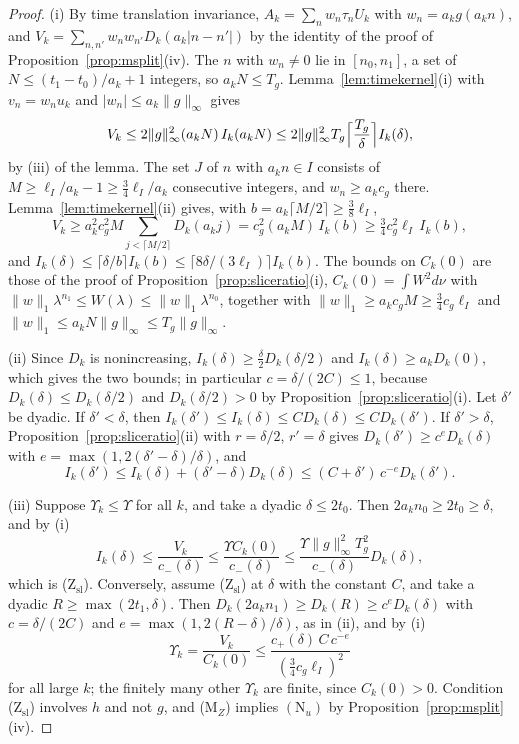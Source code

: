 \documentclass[aps,prd,twocolumn,superscriptaddress,nofootinbib,longbibliography,floatfix,amsmath,amssymb,10pt]{revtex4-2}
\theoremstyle{definition}
\theoremstyle{remark}
\begin{document}
\begin{proof}
(i) By time translation invariance, $A_k=\sum_nw_n\tau_nU_k$ with
$w_n=a_kg(a_kn)$, and $V_k=\sum_{n,n'}w_nw_{n'}D_k(a_k|n-n'|)$ by the
identity of the proof of Proposition~\ref{prop:msplit}(iv). The $n$ with
$w_n\ne0$ lie in $[n_0,n_1]$, a set of $N\le(t_1-t_0)/a_k+1$ integers, so
$a_kN\le T_g$. Lemma~\ref{lem:timekernel}(i) with $v_n=w_nu_k$ and
$|w_n|\le a_k\|g\|_\infty$ gives
\[
V_k\le2\|g\|_\infty^2(a_kN)\,I_k(a_kN)\le2\|g\|_\infty^2T_g\Bigl\lceil
\frac{T_g}\delta\Bigr\rceil I_k(\delta) ,
\]
by (iii) of the lemma. The set $J$ of $n$ with $a_kn\in I$ consists of
$M\ge\ell_I/a_k-1\ge\frac34\ell_I/a_k$ consecutive integers, and $w_n\ge
a_kc_g$ there. Lemma~\ref{lem:timekernel}(ii) gives, with
$b=a_k\lceil M/2\rceil\ge\frac38\ell_I$,
\[
V_k\ge a_k^2c_g^2M\!\!\sum_{j<\lceil M/2\rceil}\!\!D_k(a_kj)
=c_g^2(a_kM)\,I_k(b)\ge\tfrac34c_g^2\ell_I\,I_k(b),
\]
and $I_k(\delta)\le\lceil\delta/b\rceil I_k(b)\le\lceil8\delta/(3\ell_I)
\rceil I_k(b)$. The bounds on $C_k(0)$ are those of the proof of
Proposition~\ref{prop:sliceratio}(i), $C_k(0)=\int W^2d\nu$ with
$\|w\|_1\lambda^{n_1}\le W(\lambda)\le\|w\|_1\lambda^{n_0}$, together with
$\|w\|_1\ge a_kc_gM\ge\frac34c_g\ell_I$ and $\|w\|_1\le a_kN\|g\|_\infty
\le T_g\|g\|_\infty$.

(ii) Since $D_k$ is nonincreasing, $I_k(\delta)\ge\frac\delta2D_k(\delta/2)$
and $I_k(\delta)\ge a_kD_k(0)$, which gives the two bounds; in particular
$c=\delta/(2C)\le1$, because $D_k(\delta)\le D_k(\delta/2)$ and
$D_k(\delta/2)>0$ by Proposition~\ref{prop:sliceratio}(i). Let
$\delta'$ be dyadic. If $\delta'<\delta$, then $I_k(\delta')\le
I_k(\delta)\le CD_k(\delta)\le CD_k(\delta')$. If $\delta'>\delta$,
Proposition~\ref{prop:sliceratio}(ii) with $r=\delta/2$, $r'=\delta$ gives
$D_k(\delta')\ge c^{e}D_k(\delta)$ with $e=\max(1,2(\delta'-\delta)/\delta)$,
and
\[
I_k(\delta')\le I_k(\delta)+(\delta'-\delta)D_k(\delta)\le
(C+\delta')\,c^{-e}D_k(\delta') .
\]

(iii) Suppose $\Upsilon_k\le\Upsilon$ for all $k$, and take a dyadic
$\delta\le2t_0$. Then $2a_kn_0\ge2t_0\ge\delta$, and by (i)
\[
I_k(\delta)\le\frac{V_k}{c_-(\delta)}\le\frac{\Upsilon C_k(0)}{c_-(\delta)}
\le\frac{\Upsilon\|g\|_\infty^2T_g^2}{c_-(\delta)}D_k(\delta) ,
\]
which is (Z$_{\mathrm{sl}}$). Conversely, assume (Z$_{\mathrm{sl}}$) at
$\delta$ with the constant $C$, and take a dyadic $R\ge\max(2t_1,\delta)$.
Then $D_k(2a_kn_1)\ge D_k(R)\ge c^eD_k(\delta)$ with $c=\delta/(2C)$ and
$e=\max(1,2(R-\delta)/\delta)$, as in (ii), and by (i)
\[
\Upsilon_k=\frac{V_k}{C_k(0)}\le\frac{c_+(\delta)\,C\,c^{-e}}
{(\frac34c_g\ell_I)^2}
\]
for all large $k$; the finitely many other $\Upsilon_k$ are finite, since
$C_k(0)>0$. Condition (Z$_{\mathrm{sl}}$) involves $h$ and not $g$, and
(M$_Z$) implies $(\mathrm N_u)$ by Proposition~\ref{prop:msplit}(iv).
\end{proof}
\end{document}
